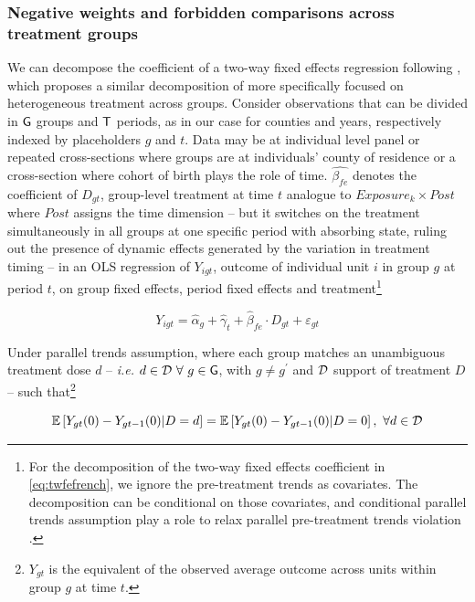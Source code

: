 \documentclass[11pt]{article}
\begin{document}
\subsubsection{Negative weights and forbidden comparisons across treatment groups}

We can decompose the coefficient of a two-way fixed effects regression following \citet{bib:dechaisemartin2020}, which proposes a similar decomposition of \citet{bib:goodman-bacon2021} more specifically focused on heterogeneous treatment across groups. Consider observations that can be divided in $\mathsf{G}$ groups and $\mathsf{T}$ periods, as in our case for counties and years, respectively indexed by placeholders $g$ and $t$. Data may be at individual level panel or repeated cross-sections where groups are at individuals' county of residence or a cross-section where cohort of birth plays the role of time. $\hat{\beta_{fe}}$ denotes the coefficient of $D_{gt}$, group-level treatment at time $t$ analogue to $Exposure_{k} \times Post$ where $Post$ assigns the time dimension -- but it switches on the treatment simultaneously in all groups at one specific period with absorbing state, ruling out the presence of dynamic effects generated by the variation in treatment timing -- in an OLS regression of $Y_{igt}$, outcome of individual unit $i$ in group $g$ at period $t$, on group fixed effects, period fixed effects and treatment\footnote{For the decomposition of the two-way fixed effects coefficient in \eqref{eq:twfefrench}, we ignore the pre-treatment trends as covariates. The decomposition can be conditional on those covariates, and conditional parallel trends assumption play a role to relax parallel pre-treatment trends violation \citep[see][for an overview of conditional parallel trends]{bib:roth2022}.}

\begin{equation}
    Y_{igt} = \hat{\alpha}_{g} + \hat{\gamma}_{t} + \hat{\beta}_{fe} \cdot D_{gt} + \varepsilon_{gt} \label{eq:twfefrench}
\end{equation}

Under parallel trends assumption, where each group matches an unambiguous treatment dose $d$ -- \textit{i.e.} $d \in \mathcal{D} \ \forall \ g \in \mathsf{G}$, with $g \neq g^{\prime}$ and $\mathcal{D}$ support of treatment $D$ -- such that\footnote{$Y_{gt}$ is the equivalent of the observed average outcome across units within group $g$ at time $t$.}

\begin{equation}
    \mathbb{E} \left[ Y_{gt}(0) - Y_{gt-1}(0) | D = d \right] = \mathbb{E} \left[ Y_{gt}(0) - Y_{gt-1}(0) | D = 0 \right], \ \forall d \in \mathcal{D}
\end{equation}
\end{document}
